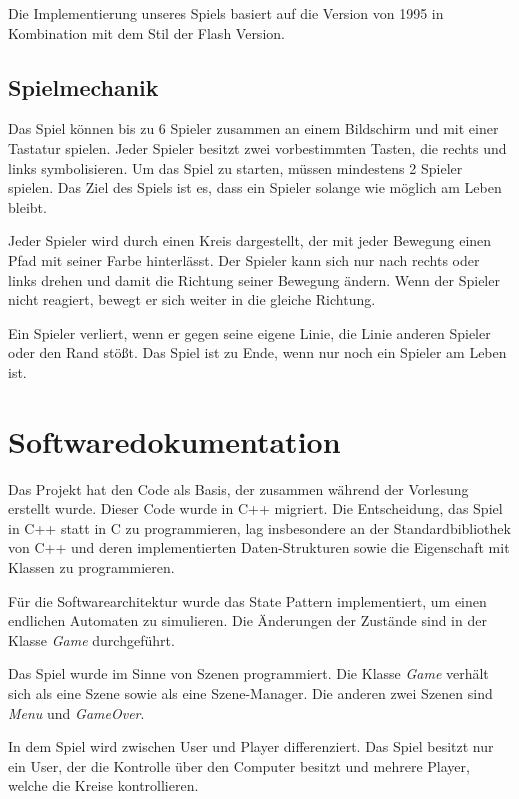 \documentclass[doktyp=studarbeit]{TUBAFarbeiten}
\begin{document}
Die Implementierung unseres Spiels basiert auf die Version von 1995 in 
Kombination mit dem Stil der Flash Version.

\subsection{Spielmechanik}

Das Spiel können bis zu 6 Spieler zusammen an einem Bildschirm und mit einer 
Tastatur spielen. Jeder Spieler besitzt zwei vorbestimmten Tasten, die rechts 
und links symbolisieren. Um das Spiel zu starten, müssen mindestens 
2 Spieler spielen. Das Ziel des Spiels ist es, dass ein Spieler solange wie
möglich am Leben bleibt.

Jeder Spieler wird durch einen Kreis dargestellt, der mit jeder Bewegung einen 
Pfad mit seiner Farbe hinterlässt. Der Spieler kann sich nur nach
rechts oder links drehen und damit die Richtung seiner Bewegung ändern. Wenn
der Spieler nicht reagiert, bewegt er sich weiter in die gleiche Richtung.

Ein Spieler verliert, wenn er gegen seine eigene Linie, die Linie anderen 
Spieler oder den Rand stößt. Das Spiel ist zu Ende, wenn nur noch ein 
Spieler am Leben ist.

\section{Softwaredokumentation}

Das Projekt hat den Code als Basis, der zusammen während der Vorlesung 
erstellt wurde. Dieser Code wurde in C++ migriert. 
Die Entscheidung, das Spiel in C++ statt in C zu programmieren, lag 
insbesondere an der Standardbibliothek von C++ und deren implementierten 
Daten-Strukturen sowie die Eigenschaft mit Klassen zu programmieren.

Für die Softwarearchitektur wurde das State Pattern implementiert, um einen 
endlichen Automaten zu simulieren. Die Änderungen der Zustände sind in der 
Klasse \textit{Game} durchgeführt.

Das Spiel wurde im Sinne von Szenen programmiert. Die Klasse \textit{Game}
verhält sich als eine Szene sowie als eine Szene-Manager. Die anderen
zwei Szenen sind \textit{Menu} und \textit{GameOver}.

In dem Spiel wird zwischen User und Player differenziert. Das Spiel besitzt nur
ein User, der die Kontrolle über den Computer besitzt und mehrere Player, 
welche die Kreise kontrollieren.
\end{document}
